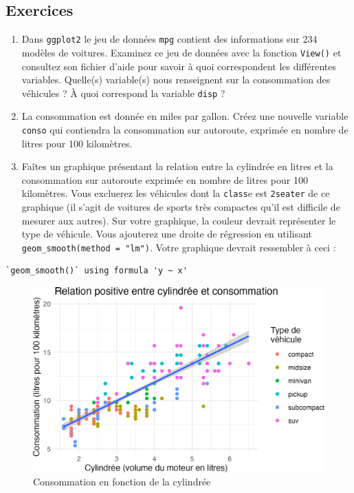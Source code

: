 \documentclass[
  letterpaper,
  DIV=11,
  numbers=noendperiod]{scrreprt}
\begin{document}
\hypertarget{exercices}{%
\subsection{Exercices}\label{exercices}}

\begin{enumerate}
\def\labelenumi{\arabic{enumi}.}
\item
  Dans \texttt{ggplot2} le jeu de données \texttt{mpg} contient des
  informations sur 234 modèles de voitures. Examinez ce jeu de données
  avec la fonction \texttt{View()} et consultez son fichier d'aide pour
  savoir à quoi correspondent les différentes variables. Quelle(s)
  variable(s) nous renseignent sur la consommation des véhicules ? À
  quoi correspond la variable \texttt{disp} ?
\item
  La consommation est donnée en miles par gallon. Créez une nouvelle
  variable \texttt{conso} qui contiendra la consommation sur autoroute,
  exprimée en nombre de litres pour 100 kilomètres.
\item
  Faîtes un graphique présentant la relation entre la cylindrée en
  litres et la consommation sur autoroute exprimée en nombre de litres
  pour 100 kilomètres. Vous excluerez les véhicules dont la
  \texttt{class}e est \texttt{2seater} de ce graphique (il s'agit de
  voitures de sports très compactes qu'il est difficile de mesurer aux
  autres). Sur votre graphique, la couleur devrait représenter le type
  de véhicule. Vous ajouterez une droite de régression en utilisant
  \texttt{geom\_smooth(method\ =\ "lm")}. Votre graphique devrait
  ressembler à ceci :
\end{enumerate}

\begin{verbatim}
`geom_smooth()` using formula 'y ~ x'
\end{verbatim}

\begin{figure}

{\centering \includegraphics{./04-DataWrangling_files/figure-pdf/consommation-1.png}

}

\caption{Consommation en fonction de la cylindrée}

\end{figure}
\end{document}
